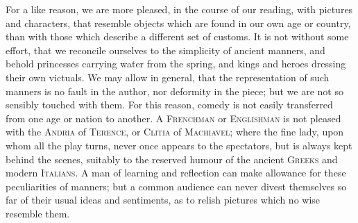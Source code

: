 For a like reason, we are more pleased, in the course of our reading,
with pictures and characters, that resemble objects which are found in
our own age or country, than with those which describe a different set
of customs. It is not without some effort, that we reconcile ourselves
to the simplicity of ancient manners, and behold princesses carrying
water from the spring, and kings and heroes dressing their own
victuals. We may allow in general, that the representation of such
manners is no fault in the author, nor  deformity in the
piece; but we are not so sensibly touched with them. For this reason,
comedy is not easily transferred from one age or nation to another. A
\textsc{Frenchman} or \textsc{Englishman} is not pleased with the
\textsc{Andria} of \textsc{Terence}, or \textsc{Clitia} of
\textsc{Machiavel}; where the fine lady, upon whom all the play turns,
never once appears to the spectators, but is always kept behind the
scenes, suitably to the reserved humour of the ancient \textsc{Greeks}
and modern \textsc{Italians}. A man of learning and reflection can
make allowance for these peculiarities of manners; but a common
audience can never divest themselves so far of their usual ideas and
sentiments, as to relish pictures which no wise resemble them.

